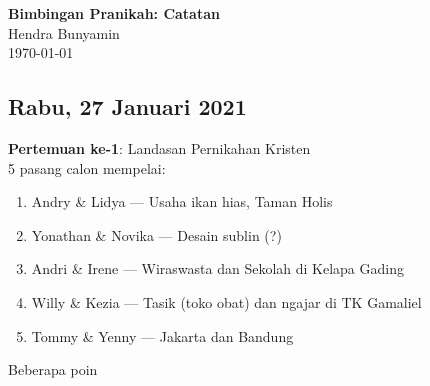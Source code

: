 \documentclass[12pt]{article}
\begin{document}
\begin{flushleft}
\textbf{Bimbingan Pranikah: Catatan} \\
Hendra Bunyamin \\
\today
\end{flushleft}

\vspace{0.1in}

\normalsize

\subsection*{Rabu, 27 Januari 2021}
\textbf{Pertemuan ke-1}: Landasan Pernikahan Kristen \\
5 pasang calon mempelai:
	\begin{enumerate}[-,topsep=0pt, nosep,label=\arabic*. ]
		\item Andry \& Lidya --- Usaha ikan hias, Taman Holis 
		\item Yonathan \& Novika --- Desain sublin (?) 
		\item Andri \& Irene --- Wiraswasta dan Sekolah di Kelapa Gading
		\item Willy \& Kezia --- Tasik (toko obat) dan ngajar di TK Gamaliel
		\item Tommy \& Yenny --- Jakarta dan Bandung
	\end{enumerate}

Beberapa poin
\end{document}
